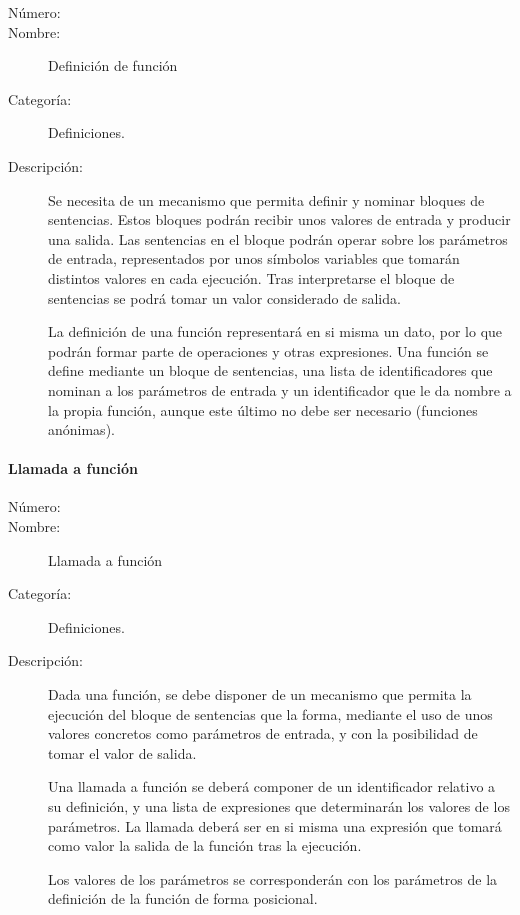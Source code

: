 	\begin{description}
		\item [Número:] \cn
		\item [Nombre:] Definición de función
		\item [Categoría:] Definiciones.
		\item [Descripción:] Se necesita de un mecanismo que permita definir y nominar bloques de sentencias. Estos bloques podrán recibir unos valores
		de entrada y producir una salida. Las sentencias en el bloque podrán operar sobre los parámetros de entrada, representados por
		unos símbolos variables que tomarán distintos valores en cada ejecución. Tras interpretarse el bloque 
		de sentencias se podrá tomar un valor considerado de salida. 
		
		La definición de una función representará en si misma un dato, por lo que podrán formar parte de operaciones 
		y otras expresiones. 
		Una función se define mediante un bloque de sentencias, una lista de identificadores que nominan a los parámetros de entrada y un 
		identificador que le da nombre a la propia función, aunque este último no debe ser necesario (funciones anónimas). 
		
	\end{description}

\paragraph{Llamada a función}
	\begin{description}
		\item [Número:] \cn
		\item [Nombre:] Llamada a función
		\item [Categoría:] Definiciones.
		\item [Descripción:] Dada una función, se debe disponer de un mecanismo que permita la ejecución del bloque de 
		sentencias que la forma, mediante el uso de unos valores concretos como parámetros de entrada, y con la posibilidad de tomar 
		el valor de salida.
		
		Una llamada a función se deberá componer de un identificador relativo a su definición, y una lista de expresiones
		que determinarán los valores de los parámetros. La llamada deberá ser en si misma una expresión 
		que tomará como valor la salida de la función tras la ejecución.
		
		Los valores de los parámetros se corresponderán con los parámetros de la definición de la función de forma posicional.
	\end{description}

